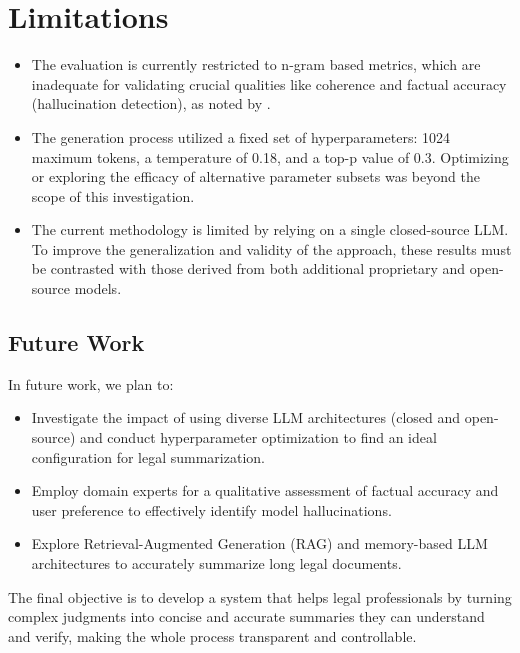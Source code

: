 \documentclass[sigconf]{acmart}
\begin{document}
\section*{Limitations}
\begin{itemize}
    \item The evaluation is currently restricted to n-gram based metrics, which are inadequate for validating crucial qualities like coherence and factual accuracy (hallucination detection), as noted by \citet{deroy2024applicability}.
    \item The generation process utilized a fixed set of hyperparameters: 1024 maximum tokens, a temperature of 0.18, and a top-p value of 0.3. Optimizing or exploring the efficacy of alternative parameter subsets was beyond the scope of this investigation.
    \item The current methodology is limited by relying on a single closed-source LLM. To improve the generalization and validity of the approach, these results must be contrasted with those derived from both additional proprietary and open-source models.
    
\end{itemize}

\subsection*{Future Work}
In future work, we plan to:
\begin{itemize}
  \item Investigate the impact of using diverse LLM architectures (closed and open-source) and conduct hyperparameter optimization to find an ideal configuration for legal summarization.
  \item Employ domain experts for a qualitative assessment of factual accuracy and user preference to effectively identify model hallucinations.
  \item Explore Retrieval-Augmented Generation (RAG) and memory-based LLM architectures to accurately summarize long legal documents.
\end{itemize}

The final objective is to develop a system that helps legal professionals by turning complex judgments into concise and accurate summaries they can understand and verify, making the whole process transparent and controllable.





\end{document}
